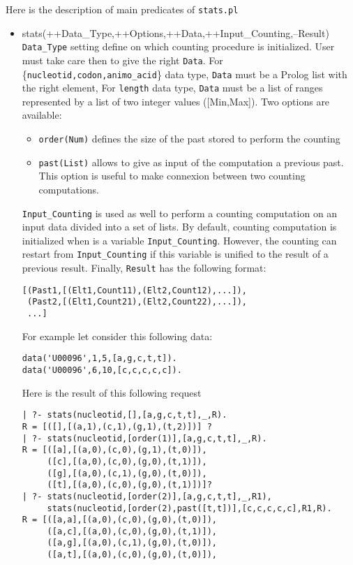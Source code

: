 \documentclass{book}
\begin{document}
Here is the description of main predicates of \texttt{stats.pl}
\begin{itemize}
\item stats(++Data\_Type,++Options,++Data,++Input\_Counting,--Result) \\
\texttt{Data\_Type} setting define on which counting procedure is initialized. User must take care then
to give the right \texttt{Data}. For \{\texttt{nucleotid,codon,animo\_acid}\} data type, 
\texttt{Data} must be a Prolog list with the right element, For \texttt{length} data type,
\texttt{Data} must be a list of ranges represented by a list of two integer values ([Min,Max]).
Two options are available:
\begin{itemize}
\item \texttt{order(Num)} defines the size of the past stored to perform the counting
\item \texttt{past(List)} allows to give as input of the computation a previous past. This option is
useful to make connexion between two counting computations.
\end{itemize}
\texttt{Input\_Counting} is used as well to perform a counting computation on an input data divided
into a set of lists. By default, counting computation is initialized when is a variable \texttt{Input\_Counting}.
However, the counting can restart from \texttt{Input\_Counting} if this variable is unified to
the result of a previous result. Finally, \texttt{Result} has the following format:
\begin{verbatim}
[(Past1,[(Elt1,Count11),(Elt2,Count12),...]), 
 (Past2,[(Elt1,Count21),(Elt2,Count22),...]),
 ...]
\end{verbatim}
For example let consider this following data:
\begin{verbatim}
data('U00096',1,5,[a,g,c,t,t]).
data('U00096',6,10,[c,c,c,c,c]).
\end{verbatim}
Here is the result of this following request
\begin{verbatim}
| ?- stats(nucleotid,[],[a,g,c,t,t],_,R).
R = [([],[(a,1),(c,1),(g,1),(t,2)])] ?
| ?- stats(nucleotid,[order(1)],[a,g,c,t,t],_,R).
R = [([a],[(a,0),(c,0),(g,1),(t,0)]),
     ([c],[(a,0),(c,0),(g,0),(t,1)]),
     ([g],[(a,0),(c,1),(g,0),(t,0)]),
     ([t],[(a,0),(c,0),(g,0),(t,1)])]?
| ?- stats(nucleotid,[order(2)],[a,g,c,t,t],_,R1),
     stats(nucleotid,[order(2),past([t,t])],[c,c,c,c,c],R1,R).
R = [([a,a],[(a,0),(c,0),(g,0),(t,0)]),
     ([a,c],[(a,0),(c,0),(g,0),(t,1)]),
     ([a,g],[(a,0),(c,1),(g,0),(t,0)]),
     ([a,t],[(a,0),(c,0),(g,0),(t,0)]),

\end{verbatim}
\end{itemize}
\end{document}

